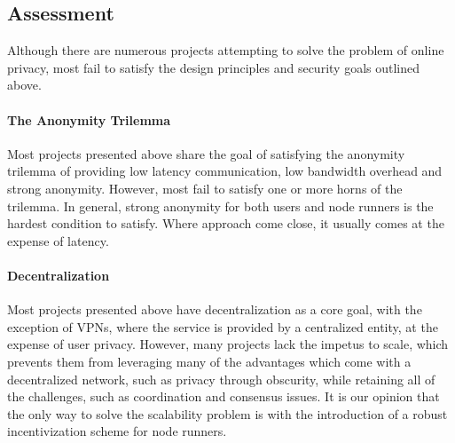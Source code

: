 \subsection{Assessment}

Although there are numerous projects attempting to solve the problem of online privacy, most fail to satisfy the design principles and security goals outlined above.

\paragraph{The Anonymity Trilemma} \cite{AnonymityTrilemma} Most projects presented above share the goal of satisfying the anonymity trilemma of providing low latency
communication, low bandwidth overhead and strong anonymity. However, most fail to satisfy one or more horns of the trilemma. In general, strong anonymity for both users and node runners is the hardest condition to satisfy. Where approach come close, it usually comes at the expense of latency.

\paragraph{Decentralization} Most projects presented above have decentralization as a core goal, with the exception of VPNs, where the service is provided by a centralized entity, at the expense of user privacy. However, many projects lack the impetus to scale, which prevents them from leveraging many of the advantages which come with a decentralized network, such as privacy through obscurity, while retaining all of the challenges, such as coordination and consensus issues. It is our opinion that the only way to solve the scalability problem is with the introduction of a robust incentivization scheme for node runners.

